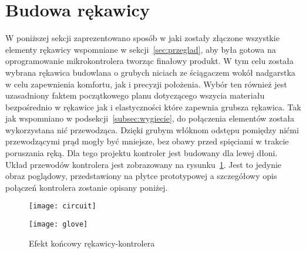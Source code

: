 \section{Budowa rękawicy}
\label{sec:budowa}

W poniższej sekcji zaprezentowano sposób w jaki zostały złączone wszystkie elementy rękawicy wspomniane w sekcji~\ref{sec:przeglad}, aby była gotowa na oprogramowanie mikrokontrolera tworząc finałowy produkt. W tym celu została wybrana rękawica budowlana o grubych niciach ze ściągaczem wokół nadgarstka w celu zapewnienia komfortu, jak i precyzji położenia. Wybór ten również jest uzasadniony faktem początkowego planu dotyczącego wszycia materiału bezpośrednio w rękawice jak i elastyczności które zapewnia grubsza rękawica. Tak jak wspomniano w podsekcji~\ref{subsec:wygiecie}, do połączenia elementów została wykorzystana nić przewodząca. Dzięki grubym włóknom odstępu pomiędzy nićmi przewodzącymi prąd mogły być mniejsze, bez obawy przed spięciami w trakcie poruszania ręką. Dla tego projektu kontroler jest budowany dla lewej dłoni. Układ przewodów kontrolera jest zobrazowany na rysunku~\ref{fig:circuit}. Jest to jedynie obraz poglądowy, przedstawiony na płytce prototypowej a szczegółowy opis połączeń kontrolera zostanie opisany poniżej.

\begin{figure}[h]
\centering
\texttt{[image: circuit]}
\label{fig:circuit}
\end{figure}

\begin{figure}[h]
\centering
\texttt{[image: glove]}
\caption{Efekt końcowy rękawicy-kontrolera}
\label{fig:glove}
\end{figure}

